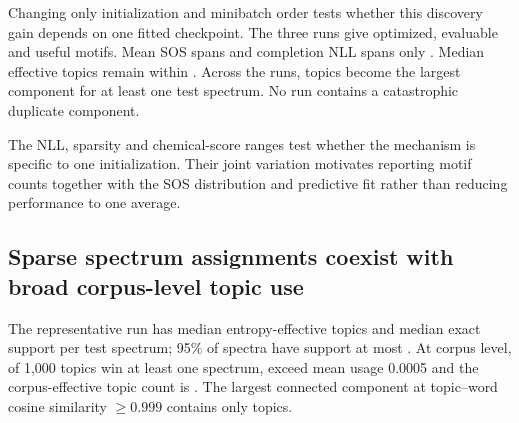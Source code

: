 \documentclass[10pt,a4paper]{article}
\begin{document}
Changing only initialization and minibatch order tests whether this discovery
gain depends on one fitted checkpoint. The three runs give
\StabilityOptimizedRange{} optimized, \StabilityEvaluableRange{} evaluable and
\StabilityUsefulRange{} useful motifs. Mean SOS spans
\StabilitySOSRange{} and completion NLL spans only
\StabilityNLLRange{}. Median effective topics remain within
\StabilityMedianEffectiveRange{}. Across the runs,
\StabilityUniqueRange{} topics become the largest component for at least one
test spectrum. No run contains a catastrophic duplicate component.

\begin{table}[H]
\centering
\scriptsize
\caption{Same-split training-seed stability. SOS is the substructure overlap
score, NLL is completion negative log-likelihood and median eff. is the median
entropy-effective topic count; unique counts distinct document winners. The
final row reports the descriptive sample mean and standard deviation for three
initializations, not population uncertainty.}
\label{tab:stability}
\end{table}

The NLL, sparsity and chemical-score ranges test whether the mechanism is
specific to one initialization. Their joint variation motivates reporting motif
counts together with the SOS distribution and predictive fit rather than
reducing performance to one average.

\subsection{Sparse spectrum assignments coexist with broad corpus-level topic use}

The representative run has median \MedianEffectiveTopics{} entropy-effective
topics and median exact support \MedianExactSupport{} per test spectrum;
95\% of spectra have support at most \NinetyFifthExactSupport{}. At corpus level,
\UniqueTopOneTopics{} of 1,000 topics win at least one spectrum,
\ActiveTopics{} exceed mean usage 0.0005 and the corpus-effective topic count is
\CorpusEffectiveTopics{}. The largest connected component at topic--word cosine
similarity $\geq0.999$ contains only
\LargestStrictDuplicateComponent{} topics.
\end{document}
